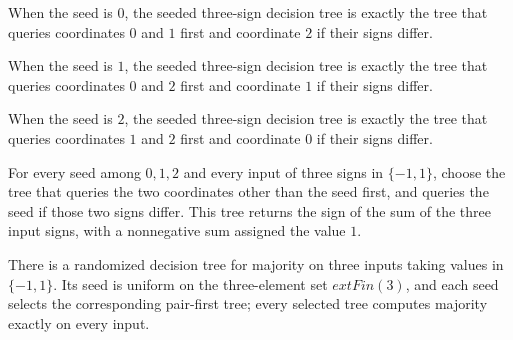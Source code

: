 \begin{theorem}
\label{FABL.majorityThreeTreeBySeed_zero}
\leanok
{}
When the seed is $0$, the seeded three-sign decision tree is exactly the tree that
queries coordinates $0$ and $1$ first and coordinate $2$ if their signs differ.
\end{theorem}

\begin{theorem}
\label{FABL.majorityThreeTreeBySeed_one}
\leanok
{}
When the seed is $1$, the seeded three-sign decision tree is exactly the tree that
queries coordinates $0$ and $2$ first and coordinate $1$ if their signs differ.
\end{theorem}

\begin{theorem}
\label{FABL.majorityThreeTreeBySeed_two}
\leanok
{}
When the seed is $2$, the seeded three-sign decision tree is exactly the tree that
queries coordinates $1$ and $2$ first and coordinate $0$ if their signs differ.
\end{theorem}

\begin{theorem}
\label{FABL.majorityThreeTreeBySeed_computes}
\leanok
{}
For every seed among $0,1,2$ and every input of three signs in $\{-1,1\}$, choose the
tree that queries the two coordinates other than the seed first, and queries the seed if
those two signs differ. This tree returns the sign of the sum of the three input signs,
with a nonnegative sum assigned the value $1$.
\end{theorem}

\begin{definition}
\label{FABL.majorityThreeRandomizedTree}
\leanok
{}
There is a randomized decision tree for majority on three inputs taking values in
$\{-1,1\}$. Its seed is uniform on the three-element set $	ext{Fin}(3)$, and each seed
selects the corresponding pair-first tree; every selected tree computes majority exactly
on every input.
\end{definition}

